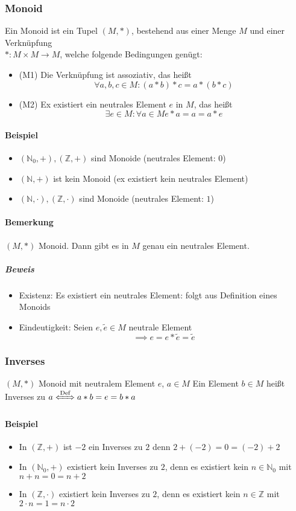 \documentclass[a4paper]{scrartcl}
\DeclareMathOperator{\Forall}{\forall}
\theoremstyle{definition}
\theoremstyle{plain}
\theoremstyle{plain}
\theoremstyle{remark}
\theoremstyle{remark}
\theoremstyle{remark}
\theoremstyle{remark}
\theoremstyle{remark}
\begin{document}
\subsubsection{Monoid}
\label{sec-3-1-2}
Ein Monoid ist ein Tupel $(M,*)$, bestehend aus einer Menge $M$ und einer Verknüpfung \\
    $*:M\times M \to M$, welche folgende Bedingungen genügt:
\begin{itemize}
\item (M1) Die Verknüpfung ist assoziativ, das heißt \[\Forall a,b,c\in M:(a*b)*c = a*(b*c) \]
\item (M2) Ex existiert ein neutrales Element $e$ in $M$, das heißt \[\exists e\in M:\Forall a\in M e*a = a = a*e\]
\end{itemize}
\paragraph{Beispiel}
\label{sec-3-1-2-1}
\begin{itemize}
\item $(\mathbb{N}_0,+), (\mathbb{Z},+)$ sind Monoide (neutrales Element: $0$)
\item $(\mathbb{N},+)$ ist kein Monoid (ex existiert kein neutrales Element)
\item $(\mathbb{N},\cdot),(\mathbb{Z},\cdot)$ sind Monoide (neutrales Element: $1$)
\end{itemize}
\paragraph{Bemerkung}
\label{sec-3-1-2-2}
$(M,*)$ Monoid. Dann gibt es in $M$ genau ein neutrales Element.
\subparagraph{Beweis}
\label{sec-3-1-2-2-1}
\begin{itemize}
\item Existenz: Es existiert ein neutrales Element: folgt aus Definition eines Monoids
\item Eindeutigkeit: Seien $e,\tilde e \in M$ neutrale Element \[\implies e = e * \tilde e = \tilde e\]
\end{itemize}
\subsubsection{Inverses}
\label{sec-3-1-3}
$(M,*)$ Monoid mit neutralem Element $e$, $a\in M$
Ein Element $b\in M$ heißt Inverses zu $a \xLeftrightarrow{\text{Def}} a * b = e = b * a$
\paragraph{Beispiel}
\label{sec-3-1-3-1}
\begin{itemize}
\item In $(\mathbb{Z},+)$ ist $-2$ ein Inverses zu $2$ denn $2 + (-2) = 0 = (-2) + 2$
\item In $(\mathbb{N}_0,+)$ existiert kein Inverses zu $2$, denn es existiert kein $n\in \mathbb{N}_0$ mit $n + n = 0 = n + 2$
\item \label{invex} In $(\mathbb{Z},\cdot)$ existiert kein Inverses zu $2$, denn es existiert kein $n\in\mathbb{Z}$ mit $2\cdot n = 1 = n \cdot 2$
\end{itemize}
\end{document}
